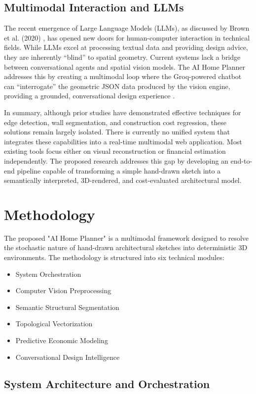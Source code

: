 \documentclass[10pt, conference, a4paper]{IEEEtran}
\begin{document}
\subsection{Multimodal Interaction and LLMs}
The recent emergence of Large Language Models (LLMs), as discussed by Brown et al. (2020) \cite{15}, has opened new doors for human-computer interaction in technical fields. While LLMs excel at processing textual data and providing design advice, they are inherently ``blind'' to spatial geometry. Current systems lack a bridge between conversational agents and spatial vision models. The AI Home Planner addresses this by creating a multimodal loop where the Groq-powered chatbot can ``interrogate'' the geometric JSON data produced by the vision engine, providing a grounded, conversational design experience \cite{2}.

In summary, although prior studies have demonstrated effective techniques for edge detection, wall segmentation, and construction cost regression, these solutions remain largely isolated. There is currently no unified system that integrates these capabilities into a real-time multimodal web application. Most existing tools focus either on visual reconstruction or financial estimation independently. The proposed research addresses this gap by developing an end-to-end pipeline capable of transforming a simple hand-drawn sketch into a semantically interpreted, 3D-rendered, and cost-evaluated architectural model.

\section{Methodology}
The proposed "AI Home Planner" is a multimodal framework designed to resolve the stochastic nature of hand-drawn architectural sketches into deterministic 3D environments. The methodology is structured into six technical modules: 
\begin{itemize}
    \item System Orchestration
    \item Computer Vision Preprocessing 
    \item Semantic Structural Segmentation 
    \item Topological Vectorization 
    \item Predictive Economic Modeling 
    \item Conversational Design Intelligence
\end{itemize}

\subsection{System Architecture and Orchestration}
\end{document}
